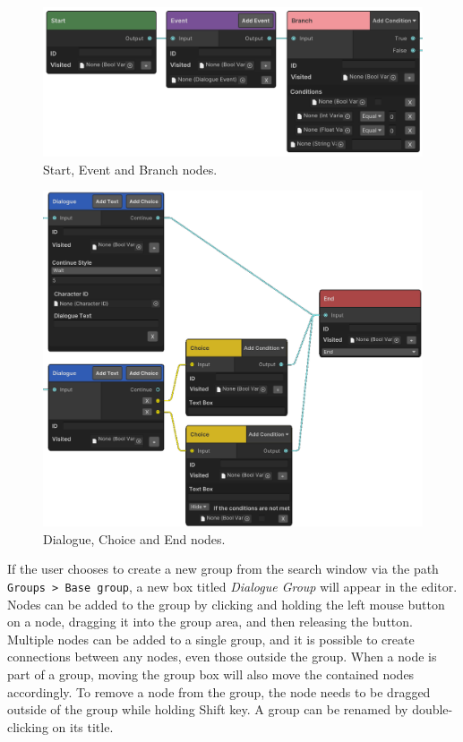 \begin{figure}[H]
\centering
\includegraphics[width=1\linewidth]{img/User doc/nodes1.png}
\caption{Start, Event and Branch nodes.}
\label{fig:Manual-Nodes1}
\end{figure}
\begin{figure}[H]
\centering
\includegraphics[width=1\linewidth]{img/User doc/nodes2.png}
\caption{Dialogue, Choice and End nodes.}
\label{fig:Manual-Nodes2}
\end{figure}

If the user chooses to create a new group from the search window via the path \verb|Groups > Base group|, a new box titled \textit{Dialogue Group} will appear in the editor. Nodes can be added to the group by clicking and holding the left mouse button on a node, dragging it into the group area, and then releasing the button. Multiple nodes can be added to a single group, and it is possible to create connections between any nodes, even those outside the group. When a node is part of a group, moving the group box will also move the contained nodes accordingly. To remove a node from the group, the node needs to be dragged outside of the group while holding Shift key. A group can be renamed by double-clicking on its title. 

